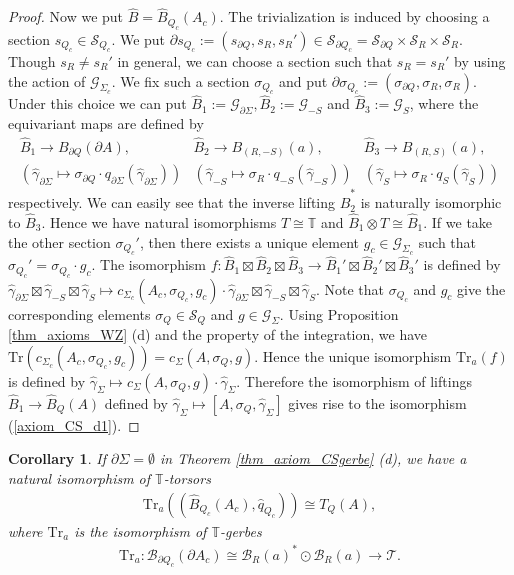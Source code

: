 \documentclass[a4paper,a4paper]{article}
\newtheorem{cor}[thm]{Corollary}
\theoremstyle{definition}
\theoremstyle{remark}
\newcommand{\T}{\mathbb{T}}
\newcommand{\B}{\mathcal{B}}
\newcommand{\G}{\mathcal{G}}
\newcommand{\sT}{\mathcal{T}}
\newcommand{\Tr}{\mathrm{Tr}}
\newcommand{\hq}{\widehat{q}}
\renewcommand{\S}{\mathcal{S}}
\def\h#1{ \widehat{#1} }
\begin{document}
\begin{proof}
Now we put $\h{B} = \h{B}_{Q_c}(A_c)$. The trivialization is induced by choosing a section $s_{Q_c} \in \S_{Q_c}$. We put $\partial s_{Q_c} := (s_{\partial Q}, s_R, s_R') \in \S_{\partial Q_c} = \S_{\partial Q} \times \S_R \times \S_R$.  Though $s_R \neq s_R'$ in general, we can choose a section such that $s_R = s_R'$ by using the action of $\G_{\Sigma_c}$. We fix such a section $\sigma_{Q_c}$ and put $\partial \sigma_{Q_c} := (\sigma_{\partial Q}, \sigma_R, \sigma_R)$. Under this choice we can put $\h{B}_1 := \G_{\partial \Sigma}, \h{B}_2 := \G_{-S}$ and $\h{B}_3 := \G_S$, where the equivariant maps are defined by
$$
\begin{array}{ccc}
\h{B}_1 \rightarrow B_{\partial Q}(\partial A) , &
\h{B}_2 \rightarrow B_{(R, -S)}(a),  &
\h{B}_3 \rightarrow B_{(R,  S)}(a), \\
(\h{\gamma}_{\partial \Sigma} \mapsto 
\sigma_{\partial Q} \cdot 
q_{\partial \Sigma}(\h{\gamma}_{\partial \Sigma})) &
(\h{\gamma}_{-S} \mapsto \sigma_R \cdot q_{-S}(\h{\gamma}_{-S})) &
(\h{\gamma}_{ S} \mapsto \sigma_R \cdot q_{ S}(\h{\gamma}_{ S})) 
\end{array}
$$
respectively. We can easily see that the inverse lifting $\h{B}_2^*$ is naturally isomorphic to $\h{B}_3$. Hence we have natural isomorphisms $T \cong \T$ and $\h{B}_1 \otimes T \cong \h{B}_1$. If we take the other section $\sigma_{Q_c}'$, then there exists a unique element $g_c \in \G_{\Sigma_c}$ such that $\sigma_{Q_c}' = \sigma_{Q_c} \cdot g_c$. The isomorphism $f : \h{B}_1 \boxtimes \h{B}_2 \boxtimes \h{B}_3 \to \h{B}_1' \boxtimes \h{B}_2' \boxtimes \h{B}_3'$ is defined by $\h{\gamma}_{\partial \Sigma} \boxtimes \h{\gamma}_{-S} \boxtimes \h{\gamma}_S \mapsto c_{\Sigma_c}(A_c, \sigma_{Q_c}, g_c) \cdot \h{\gamma}_{\partial \Sigma} \boxtimes \h{\gamma}_{-S} \boxtimes \h{\gamma}_S$. Note that $\sigma_{Q_c}$ and $g_c$ give the corresponding elements $\sigma_Q \in \S_Q$ and $g \in \G_\Sigma$. Using Proposition \ref{thm_axioms_WZ} (d) and the property of the integration, we have $\Tr( c_{\Sigma_c}(A_c, \sigma_{Q_c}, g_c)) = c_\Sigma(A, \sigma_Q, g)$. Hence the unique isomorphism $\Tr_a(f)$ is defined by $\h{\gamma}_\Sigma \mapsto c_\Sigma(A, \sigma_Q, g) \cdot \h{\gamma}_\Sigma$. Therefore the isomorphism of liftings $\h{B}_1 \to \h{B}_Q(A)$ defined by $\h{\gamma}_\Sigma \mapsto [A, \sigma_Q, \h{\gamma}_\Sigma]$ gives rise to the isomorphism (\ref{axiom_CS_d1}). 
\end{proof}

\begin{cor}
If $\partial \Sigma = \emptyset$ in Theorem \ref{thm_axiom_CSgerbe} (d), we have a natural isomorphism of $\T$-torsors
\begin{eqnarray}
\Tr_a \left( (\h{B}_{Q_c}(A_c), \hq_{Q_c}) \right) \cong T_Q(A),
\end{eqnarray}
where $\Tr_a$ is the isomorphism of $\T$-gerbes
\begin{eqnarray}
\Tr_a : \B_{\partial Q_c}(\partial A_c) \cong \B_R(a)^* \odot \B_R(a) 
\rightarrow \sT .
\end{eqnarray}
\end{cor}
\end{document}
